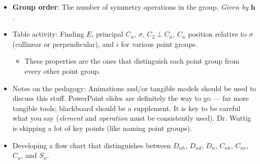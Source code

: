 \documentclass[../notes.tex]{subfiles}
\begin{document}
\begin{itemize}
    \item \textbf{Group order}: The number of symmetry operations in the group. \emph{Given by} $\bm{h}$.
    \item Table activity: Finding $E$, principal $C_n$, $\sigma$, $C_2\perp C_n$, $C_n$ position relative to $\sigma$ (collinear or perpendicular), and $i$ for various point groups.
    \begin{itemize}
        \item These properties are the ones that distinguish each point group from every other point group.
    \end{itemize}
    \item Notes on the pedagogy: Animations and/or tangible models should be used to discuss this stuff. PowerPoint slides are definitely the way to go --- far more tangible tools; blackboard should be a supplement. It is key to be careful what you say (\emph{element} and \emph{operation} must be consistently used). Dr. Wuttig is skipping a lot of key points (like naming point groups).
    \item Developing a flow chart that distinguishes between $D_{nh}$, $D_{nd}$, $D_n$, $C_{nh}$, $C_{nv}$, $C_n$, and $S_n$.
\end{itemize}
\end{document}
